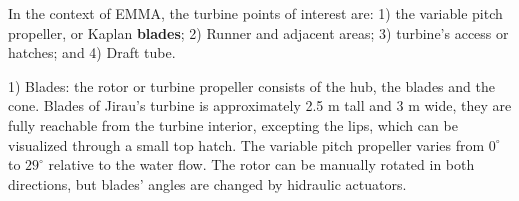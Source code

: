 In the context of EMMA, the turbine points of interest are: 1) the variable
pitch propeller, or Kaplan \textbf{blades}; 2) Runner and adjacent areas;
3) turbine's access or hatches; and 4) Draft tube.%


1) Blades: the rotor or turbine propeller consists of the hub, the
blades and the cone. Blades of Jirau's turbine is approximately 2.5 m tall
and 3 m wide, they are fully reachable from the turbine interior, excepting
the lips, which can be visualized through a small top hatch. The variable
pitch propeller varies from $0^\circ$ to $29^\circ$ relative to the water flow.
The rotor can be manually rotated in both directions, but blades' angles are
changed by hidraulic actuators.




